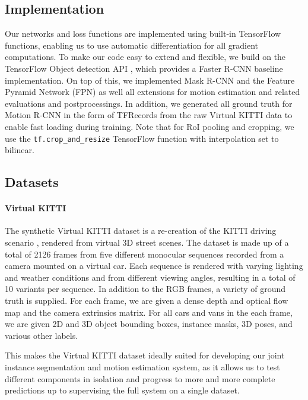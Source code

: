 \subsection{Implementation}
Our networks and loss functions are implemented using built-in TensorFlow \cite{TensorFlow}
functions, enabling us to use automatic differentiation for all gradient
computations. To make our code easy to extend and flexible, we build on
the TensorFlow Object detection API \cite{TensorFlowObjectDetection}, which provides a Faster R-CNN baseline
implementation.
On top of this, we implemented Mask R-CNN and the Feature Pyramid Network (FPN)
as well all extensions for motion estimation and related evaluations
and postprocessings. In addition, we generated all ground truth for
Motion R-CNN in the form of TFRecords from the raw Virtual KITTI
data to enable fast loading during training.
Note that for RoI pooling and cropping,
we use the \texttt{tf.crop\_and\_resize} TensorFlow function with
interpolation set to bilinear.

\subsection{Datasets}

\paragraph{Virtual KITTI}
The synthetic Virtual KITTI dataset \cite{VKITTI} is a re-creation of the KITTI
driving scenario \cite{KITTI2012, KITTI2015}, rendered from virtual 3D street
scenes.
The dataset is made up of a total of 2126 frames from five different monocular
sequences recorded from a camera mounted on a virtual car.
Each sequence is rendered with varying lighting and weather conditions and
from different viewing angles, resulting in a total of 10 variants per sequence.
In addition to the RGB frames, a variety of ground truth is supplied.
For each frame, we are given a dense depth and optical flow map and the camera
extrinsics matrix.
For all cars and vans in the each frame, we are given 2D and 3D object bounding
boxes, instance masks, 3D poses, and various other labels.

This makes the Virtual KITTI dataset ideally suited for developing our joint
instance segmentation and motion estimation system, as it allows us to test
different components in isolation and progress to more and more complete
predictions up to supervising the full system on a single dataset.

